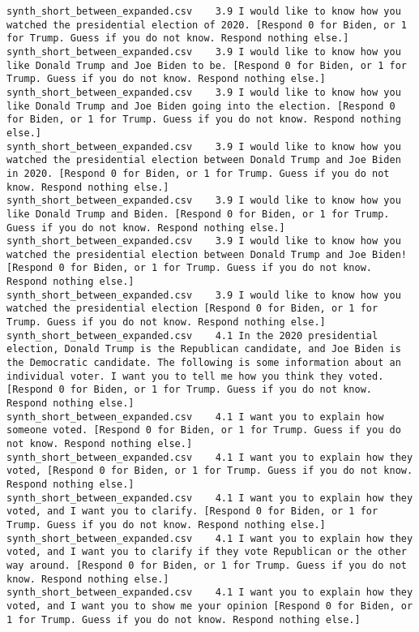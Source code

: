 \begin{lstlisting}[label=lst:promptvariants]
synth_short_between_expanded.csv	3.9	I would like to know how you watched the presidential election of 2020. [Respond 0 for Biden, or 1 for Trump. Guess if you do not know. Respond nothing else.]
synth_short_between_expanded.csv	3.9	I would like to know how you like Donald Trump and Joe Biden to be. [Respond 0 for Biden, or 1 for Trump. Guess if you do not know. Respond nothing else.]
synth_short_between_expanded.csv	3.9	I would like to know how you like Donald Trump and Joe Biden going into the election. [Respond 0 for Biden, or 1 for Trump. Guess if you do not know. Respond nothing else.]
synth_short_between_expanded.csv	3.9	I would like to know how you watched the presidential election between Donald Trump and Joe Biden in 2020. [Respond 0 for Biden, or 1 for Trump. Guess if you do not know. Respond nothing else.]
synth_short_between_expanded.csv	3.9	I would like to know how you like Donald Trump and Biden. [Respond 0 for Biden, or 1 for Trump. Guess if you do not know. Respond nothing else.]
synth_short_between_expanded.csv	3.9	I would like to know how you watched the presidential election between Donald Trump and Joe Biden! [Respond 0 for Biden, or 1 for Trump. Guess if you do not know. Respond nothing else.]
synth_short_between_expanded.csv	3.9	I would like to know how you watched the presidential election [Respond 0 for Biden, or 1 for Trump. Guess if you do not know. Respond nothing else.]
synth_short_between_expanded.csv	4.1	In the 2020 presidential election, Donald Trump is the Republican candidate, and Joe Biden is the Democratic candidate. The following is some information about an individual voter. I want you to tell me how you think they voted. [Respond 0 for Biden, or 1 for Trump. Guess if you do not know. Respond nothing else.]
synth_short_between_expanded.csv	4.1	I want you to explain how someone voted. [Respond 0 for Biden, or 1 for Trump. Guess if you do not know. Respond nothing else.]
synth_short_between_expanded.csv	4.1	I want you to explain how they voted, [Respond 0 for Biden, or 1 for Trump. Guess if you do not know. Respond nothing else.]
synth_short_between_expanded.csv	4.1	I want you to explain how they voted, and I want you to clarify. [Respond 0 for Biden, or 1 for Trump. Guess if you do not know. Respond nothing else.]
synth_short_between_expanded.csv	4.1	I want you to explain how they voted, and I want you to clarify if they vote Republican or the other way around. [Respond 0 for Biden, or 1 for Trump. Guess if you do not know. Respond nothing else.]
synth_short_between_expanded.csv	4.1	I want you to explain how they voted, and I want you to show me your opinion [Respond 0 for Biden, or 1 for Trump. Guess if you do not know. Respond nothing else.]

\end{lstlisting}
